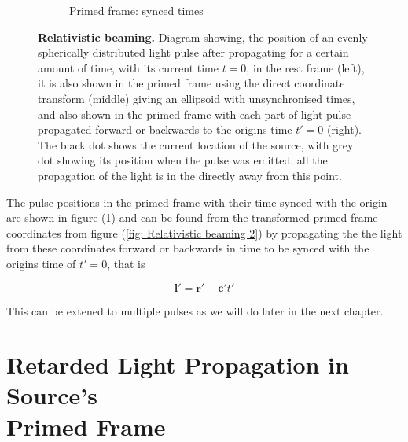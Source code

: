 \begin{figure}[H]
\begin{subfigure}{.32\textwidth}
		\caption{Primed frame: synced times}
		\label{fig: Relativistic beaming 3}
	\end{subfigure}
	\caption{\textbf{Relativistic beaming.} Diagram showing, the position of an evenly spherically distributed light pulse after propagating for a certain amount of time, with its current time ${t}=0$, in the rest frame (left), it is also shown in the primed frame using the direct coordinate transform (middle) giving an ellipsoid with unsynchronised times, and also shown in the primed frame with each part of light pulse propagated forward or backwards to the origins time $t{'}=0$ (right). The black dot shows the current location of the source, with grey dot showing its position when the pulse was emitted. all the propagation of the light is in the directly away from this point.}
	\label{fig Relativistic beaming}
\end{figure}

The pulse positions in the primed frame with their time synced with the origin are shown in figure (\ref{fig: Relativistic beaming 3}) and can be found from the transformed primed frame coordinates from figure (\ref{fig: Relativistic beaming 2}) by propagating the the light from these coordinates forward or backwards in time to be synced with the origins time of $t{'}=0$, that is

\begin{equation}
	\mathbf{l}{'} = \mathbf{r}{'} - \mathbf{c}{'} t{'}
\end{equation}

This can be extened to multiple pulses as we will do later in the next chapter.



\section[Retarded Light Propagation in Source's Primed Frame]{Retarded Light Propagation in Source's \\ Primed Frame}\label{subsect: Retarded Light Propagation}

